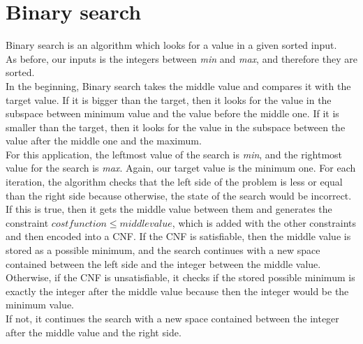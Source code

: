 \section{Binary search}
Binary search is an algorithm which looks for a value in a given sorted input.\\
As before, our inputs is the integers between \emph{min} and \emph{max}, and therefore they are sorted.\\
In the beginning, Binary search takes the middle value and compares it with the target value. If it is bigger than the target, then it looks for the value in the subspace between minimum value and the value before the middle one. If it is smaller than the target, then it looks for the value in the subspace between the value after the middle one and the maximum.\\
For this application, the leftmost value of the search is \emph{min}, and the rightmost value for the search is \emph{max}. Again, our target value is the minimum one. For each iteration, the algorithm checks that the left side of the problem is less or equal than the right side because otherwise, the state of the search would be incorrect. \\
If this is true, then it gets the middle value between them and generates the constraint $cost function \leq middle value$, which is added with the other constraints and then encoded into a CNF. If the CNF is satisfiable, then the middle value is stored as a possible minimum, and the search continues with a new space contained between the left side and the integer between the middle value. Otherwise, if the CNF is unsatisfiable, it checks if the stored possible minimum is exactly the integer after the middle value because then the integer would be the minimum value.\\
If not, it continues the search with a new space contained between the integer after the middle value and the right side.